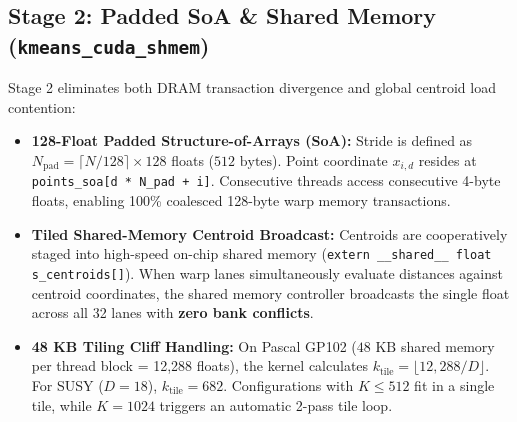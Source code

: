 \documentclass[sigconf,nonacm]{acmart}
\begin{document}
\subsection{Stage 2: Padded SoA \& Shared Memory (\texttt{kmeans\_cuda\_shmem})}
Stage 2 eliminates both DRAM transaction divergence and global centroid load contention:
\begin{itemize}
    \item \textbf{128-Float Padded Structure-of-Arrays (SoA):} Stride is defined as $N_{\text{pad}} = \lceil N / 128 \rceil \times 128$ floats ($512\text{ bytes}$). Point coordinate $x_{i,d}$ resides at \texttt{points\_soa[d * N\_pad + i]}. Consecutive threads access consecutive 4-byte floats, enabling 100\% coalesced 128-byte warp memory transactions.
    \item \textbf{Tiled Shared-Memory Centroid Broadcast:} Centroids are cooperatively staged into high-speed on-chip shared memory (\texttt{extern \_\_shared\_\_ float s\_centroids[]}). When warp lanes simultaneously evaluate distances against centroid coordinates, the shared memory controller broadcasts the single float across all 32 lanes with \textbf{zero bank conflicts}.
    \item \textbf{48 KB Tiling Cliff Handling:} On Pascal GP102 ($48\text{ KB}$ shared memory per thread block = 12,288 floats), the kernel calculates $k_{\text{tile}} = \lfloor 12{,}288 / D \rfloor$. For SUSY ($D=18$), $k_{\text{tile}} = 682$. Configurations with $K \le 512$ fit in a single tile, while $K=1024$ triggers an automatic 2-pass tile loop.
\end{itemize}
\end{document}
